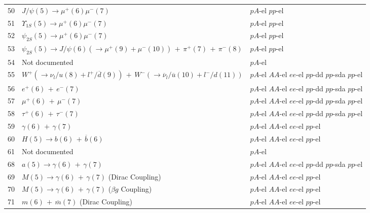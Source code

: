 \documentclass[12pt]{article}
\begin{document}
\begin{center}
\begin{table}[htbp!]
\begin{tabular}{|c|l|l|}
50 & $J/\psi(5)\to \mu^+(6)\mu^-(7)$ &  $pA$-el  $pp$-el  \\

51 & $\Upsilon_{1S}(5)\to \mu^+(6)\mu^-(7)$ &  $pA$-el  $pp$-el  \\

52 & $\psi_{2S}(5)\to \mu^+(6)\mu^-(7)$ &  $pA$-el  $pp$-el  \\

53 & $\psi_{2S}(5)\to J/\psi(6)(\to\mu^+(9)+\mu^-(10))\,+\,\pi^+(7)\,+\,\pi^-(8)$ &  $pA$-el  $pp$-el  \\

54 & Not documented &  $pA$-el  \\

55 & $W^+(\to \nu_l/u(8)+l^+/\overline{d}(9))\,+\, W^-(\to \overline{\nu}_l/\overline{u}(10)+l^-/d(11))$ &  $pA$-el  $AA$-el  $ee$-el  $pp$-dd  $pp$-sda  $pp$-el  \\

56 & $e^+(6)\,+\,e^-(7)$ &  $pA$-el  $AA$-el  $ee$-el  $pp$-dd  $pp$-sda  $pp$-el  \\

57 & $\mu^+(6)\,+\,\mu^-(7)$ &  $pA$-el  $AA$-el  $ee$-el  $pp$-dd  $pp$-sda  $pp$-el  \\

58 & $\tau^+(6)\,+\,\tau^-(7)$ &  $pA$-el  $AA$-el  $ee$-el  $pp$-dd  $pp$-sda  $pp$-el  \\

59 & $\gamma(6)\,+\,\gamma(7)$ &  $pA$-el  $AA$-el  $ee$-el  $pp$-el  \\

60 & $H(5) \to b(6)\,+\,\overline{b}(6)$ &  $pA$-el  $AA$-el  $ee$-el  $pp$-el  \\

61 & Not documented &  $pA$-el  \\

68 & $a(5)\to \gamma(6)\,+\,\gamma(7)$ &  $pA$-el  $AA$-el  $ee$-el  $pp$-dd  $pp$-sda  $pp$-el  \\

69 & $M(5) \to \gamma(6)\,+\,\gamma(7)$ (Dirac Coupling) &  $pA$-el  $AA$-el  $ee$-el  $pp$-el  \\

70 & $M(5) \to \gamma(6)\,+\,\gamma(7)$ ($\beta g$ Coupling) &  $pA$-el  $AA$-el  $ee$-el  $pp$-el  \\

71 & $m(6)\,+\,\overline{m}(7)$ (Dirac Coupling) &  $pA$-el  $AA$-el  $ee$-el  $pp$-el  \\


\end{tabular}
\end{table}
\end{center}
\end{document}

